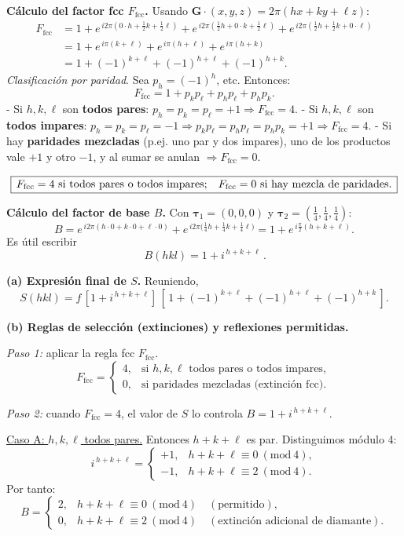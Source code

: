 \documentclass{article}
\begin{document}
\bigskip
\textbf{Cálculo del factor fcc \(F_\text{fcc}\).}  
Usando \(\mathbf{G}\cdot(x,y,z)=2\pi(hx+ky+\ell z)\):
\[
\begin{aligned}
F_\text{fcc}
&= 1
+ e^{\,i2\pi(0\cdot h+\tfrac12 k+\tfrac12 \ell)}
+ e^{\,i2\pi(\tfrac12 h+0\cdot k+\tfrac12 \ell)}
+ e^{\,i2\pi(\tfrac12 h+\tfrac12 k+0\cdot \ell)}\\[2pt]
&= 1 + e^{\,i\pi(k+\ell)} + e^{\,i\pi(h+\ell)} + e^{\,i\pi(h+k)}\\
&= 1 + (-1)^{k+\ell} + (-1)^{h+\ell} + (-1)^{h+k}.
\end{aligned}
\]
\emph{Clasificación por paridad}. Sea \(p_h=(-1)^h\), etc. Entonces:
\[
F_\text{fcc}= 1 + p_k p_\ell + p_h p_\ell + p_h p_k.
\]
- Si \(h,k,\ell\) son \textbf{todos pares}: \(p_h=p_k=p_\ell=+1 \Rightarrow F_\text{fcc}=4\).  
- Si \(h,k,\ell\) son \textbf{todos impares}: \(p_h=p_k=p_\ell=-1\Rightarrow p_kp_\ell=p_hp_\ell=p_hp_k=+1\Rightarrow F_\text{fcc}=4\).  
- Si hay \textbf{paridades mezcladas} (p.ej. uno par y dos impares), uno de los productos vale \(+1\) y otro \(-1\), y al sumar se anulan \(\Rightarrow F_\text{fcc}=0\).  

\[
\boxed{\,F_\text{fcc}=4\ \text{si todos pares o todos impares;\quad }F_\text{fcc}=0\ \text{si hay mezcla de paridades.}\,}
\]

\bigskip
\textbf{Cálculo del factor de base \(B\).}  
Con \(\boldsymbol{\tau}_1=(0,0,0)\) y \(\boldsymbol{\tau}_2=(\tfrac14,\tfrac14,\tfrac14)\):
\[
B= e^{\,i2\pi(h\cdot 0+k\cdot 0+\ell\cdot 0)} + e^{\,i2\pi\big(\tfrac14 h+\tfrac14 k+\tfrac14 \ell\big)}
= 1 + e^{\,i\frac{\pi}{2}(h+k+\ell)}.
\]
Es útil escribir
\[
\boxed{\,B(hkl)=1+i^{\,h+k+\ell}\,}.
\]

\bigskip
\textbf{(a) Expresión final de \(S\).}  
Reuniendo,
\[
\boxed{\,S(hkl)= f\,[1+i^{\,h+k+\ell}]\,[\,1+(-1)^{k+\ell}+(-1)^{h+\ell}+(-1)^{h+k}\,].\,}
\]

\bigskip
\textbf{(b) Reglas de selección (extinciones) y reflexiones permitidas.}

\emph{Paso 1:} aplicar la regla fcc \(F_\text{fcc}\).  
\[
F_\text{fcc}=
\begin{cases}
4, & \text{si } h,k,\ell \text{ todos pares o todos impares},\\
0, & \text{si paridades mezcladas (extinción fcc)}.
\end{cases}
\]

\emph{Paso 2:} cuando \(F_\text{fcc}=4\), el valor de \(S\) lo controla \(B=1+i^{\,h+k+\ell}\).

\medskip
\underline{Caso A: \(h,k,\ell\) todos pares.}  
Entonces \(h+k+\ell\) es par. Distinguimos módulo 4:
\[
i^{\,h+k+\ell}=
\begin{cases}
+1, & h+k+\ell\equiv 0\ (\mathrm{mod}\ 4),\\
-1, & h+k+\ell\equiv 2\ (\mathrm{mod}\ 4).
\end{cases}
\]
Por tanto:
\[
B=
\begin{cases}
2, & h+k+\ell\equiv 0\ (\mathrm{mod}\ 4)\quad(\text{permitido}),\\
0, & h+k+\ell\equiv 2\ (\mathrm{mod}\ 4)\quad(\text{extinción adicional de diamante}).
\end{cases}
\]
\end{document}
